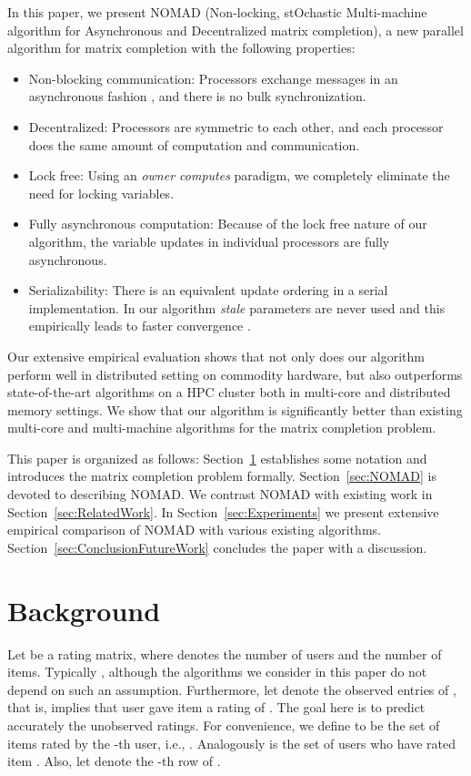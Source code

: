 \documentclass{vldb}
\begin{document}
In this paper, we present NOMAD (Non-locking, stOchastic Multi-machine
algorithm for Asynchronous and Decentralized matrix completion), a new
parallel algorithm for matrix completion with the following properties: 
\begin{itemize}
\item Non-blocking communication: Processors exchange messages in an
  asynchronous fashion \citep{BerTsi97a}, and there is no bulk
  synchronization.
\item Decentralized: Processors are symmetric to each other, and each
  processor does the same amount of computation and communication.
\item Lock free: Using an \emph{owner computes} paradigm, we completely
  eliminate the need for locking variables. 
\item Fully asynchronous computation: Because of the lock free nature
  of our algorithm, the variable updates in individual processors are
  fully asynchronous.
\item Serializability: There is an equivalent update ordering in a
  serial implementation. In our algorithm \emph{stale} parameters are
  never used and this empirically leads to faster convergence
  \citep{LowGonKyrBicetal12}.
\end{itemize}
Our extensive empirical evaluation shows that not only does our
algorithm perform well in distributed setting on commodity hardware, but
also outperforms state-of-the-art algorithms on a HPC cluster both in
multi-core and distributed memory settings. We show that our algorithm
is significantly better than existing multi-core and multi-machine
algorithms for the matrix completion problem.

This paper is organized as follows: Section~\ref{sec:prior_work}
establishes some notation and introduces the matrix completion problem
formally. Section~\ref{sec:NOMAD} is devoted to describing NOMAD. We
contrast NOMAD with existing work in Section~\ref{sec:RelatedWork}.  In
Section~\ref{sec:Experiments} we present extensive empirical comparison
of NOMAD with various existing
algorithms. Section~\ref{sec:ConclusionFutureWork} concludes the paper
with a discussion.

\section{Background}
\label{sec:prior_work}

Let  be a rating matrix, where  denotes the
number of users and  the number of items. Typically ,
although the algorithms we consider in this paper do not depend on such
an assumption. Furthermore, let  denote the observed entries of , that is,  implies that user  gave item  a rating of .
The goal here is to predict accurately the unobserved ratings.  For
convenience, we define  to be the set of items rated by the
-th user, i.e., .
Analogously  is the set of
users who have rated item .  Also, let  denote the
-th row of .
\end{document}
